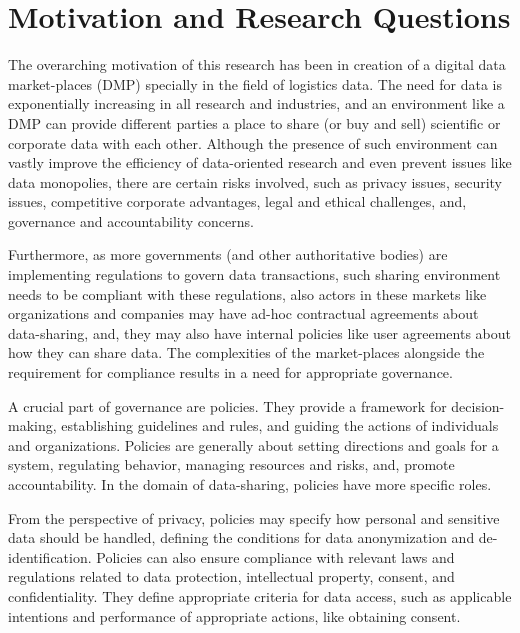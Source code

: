\section{Motivation and Research Questions}
The overarching motivation of this research has been in creation of a digital data market-places (DMP) specially in the field of logistics data. The need for data is exponentially increasing in all research and industries, and an environment like a DMP can provide different parties a place to share (or buy and sell) scientific or corporate data with each other. Although the presence of such environment can vastly improve the efficiency of data-oriented research and even prevent issues like data monopolies, there are certain risks involved, such as privacy issues, security issues, competitive corporate advantages, legal and ethical challenges, and, governance and accountability concerns.

Furthermore, as more governments (and other authoritative bodies) are implementing regulations to govern data transactions, such sharing environment needs to be compliant with these regulations, also actors in these markets like organizations and companies may have ad-hoc contractual agreements about data-sharing, and, they may also have internal policies like user agreements about how they can share data. The complexities of the market-places alongside the requirement for compliance results in a need for appropriate governance.

A crucial part of governance are policies. They provide a framework for decision-making, establishing guidelines and rules, and guiding the actions of individuals and organizations. Policies are generally about setting directions and goals for a system, regulating behavior, managing resources and risks, and, promote accountability. In the domain of data-sharing, policies have more specific roles.

From the perspective of privacy, policies may specify how personal and sensitive data should be handled, defining the conditions for data anonymization and de-identification. Policies can also ensure compliance with relevant laws and regulations related to data protection, intellectual property, consent, and confidentiality. They define appropriate criteria for data access, such as applicable intentions and performance of appropriate actions, like obtaining consent. 

